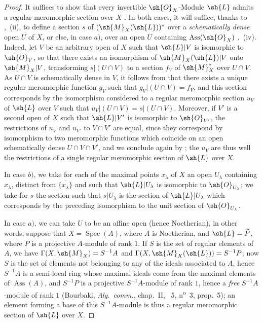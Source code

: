 \begin{proof}
It suffices to show that every invertible $\sh{O}_X$-Module $\sh{L}$ admits a regular meromorphic section over $X$ .
In both cases, it will suffice, thanks to ,~(ii), to define a section $s$ of $(\sh{M}_X(\sh{L}))^*$ over a \emph{schematically dense} open $U$ of $X$, or else, in case $a)$, over an open $U$ containing $\operatorname{Ass}(\sh{O}_X)$ ,~(iv).
Indeed, let $V$ be an arbitrary open of $X$ such that $\sh{L}|V$ is isomorphic to $\sh{O}_V$, so that there exists an isomorphism of $\sh{M}_X(\sh{L})|V$ onto $\sh{M}_X|V$, transforming $s|(U\cap V)$ to a section $f_V$ of $\sh{M}_X^*$ over $U\cap V$.
As $U\cap V$ is schematically dense in $V$, it follows from  that there exists a unique regular meromorphic function $g_V$ such that $g_V|(U\cap V)=f_V$, and this section corresponds by the isomorphism considered to a regular meromorphic section $u_V$ of $\sh{L}$ over $V$ such that $u_V|(U\cap V)=s|(U\cap V)$.
Moreover, if $V'$ is a second open of $X$ such that $\sh{L}|V'$ is isomorphic to $\sh{O}_{V'}$, the restrictions of $u_V$ and $u_{V'}$ to $V\cap V'$ are equal, since they correspond by isomorphism to two meromorphic functions which coincide on an open schematically dense $U\cap V\cap V'$, and we conclude again by ;
the $u_V$ are thus well the restrictions of a single regular meromorphic section of $\sh{L}$ over $X$.

In case $b)$, we take for each of the maximal points $x_\lambda$ of $X$ an open $U_\lambda$ containing $x_\lambda$, distinct from $\overline{\{x_\lambda\}}$ and such that $\sh{L}|U_\lambda$ is isomorphic to $\sh{O}_{U_\lambda}$;
we take for $s$ the section such that $s|U_\lambda$ is the section of $\sh{L}|U_\lambda$ which corresponds by the preceding isomorphism to the unit section of $\sh{O}_{U_\lambda}$.

In case $a)$, we can take $U$ to be an affine open (hence Noetherian), in other words, suppose that $X=\operatorname{Spec}(A)$, where $A$ is Noetherian, and $\sh{L}=\widetilde{P}$, where $P$ is a projective $A$-module of rank $1$.
If $S$ is the set of regular elements of $A$, we have $\Gamma(X,\sh{M}_X)=S^{-1}A$  and $\Gamma(X,\sh{M}_X(\sh{L}))=S^{-1}P$;
now $S$ is the set of elements not belonging to any of the ideals associated to $A$, hence $S^{-1}A$ is a semi-local ring whose maximal ideals come from the maximal elements of $\operatorname{Ass}(A)$, and $S^{-1}P$ is a projective $S^{-1}A$-module of rank $1$, hence a \emph{free} $S^{-1}A$-module of rank $1$ (Bourbaki, \emph{Alg.\ comm.}, chap.~II, \textsection~5, n\textsuperscript{o}~3, prop.~5);
an element forming a base of this $S^{-1}A$-module is thus  a regular meromorphic section of $\sh{L}$ over $X$.
\end{proof}

